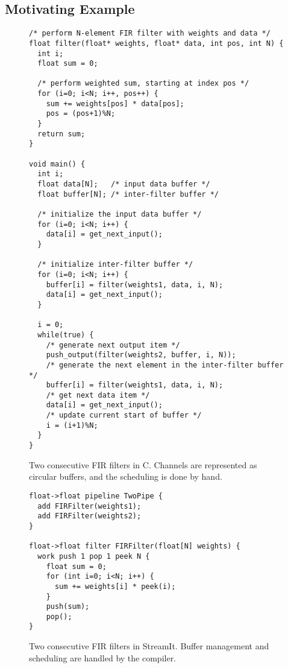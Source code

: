 \subsection{Motivating Example}
\begin{figure}
\center
\epsfxsize=2.0in
\scriptsize
\begin{verbatim}
/* perform N-element FIR filter with weights and data */
float filter(float* weights, float* data, int pos, int N) {
  int i;
  float sum = 0;

  /* perform weighted sum, starting at index pos */
  for (i=0; i<N; i++, pos++) {
    sum += weights[pos] * data[pos];
    pos = (pos+1)%N;
  }
  return sum;
}

void main() {
  int i;
  float data[N];   /* input data buffer */
  float buffer[N]; /* inter-filter buffer */
  
  /* initialize the input data buffer */
  for (i=0; i<N; i++) {
    data[i] = get_next_input();
  }
  
  /* initialize inter-filter buffer */
  for (i=0; i<N; i++) {
    buffer[i] = filter(weights1, data, i, N);
    data[i] = get_next_input();
  }
  
  i = 0;
  while(true) {
    /* generate next output item */
    push_output(filter(weights2, buffer, i, N));
    /* generate the next element in the inter-filter buffer */
    buffer[i] = filter(weights1, data, i, N);
    /* get next data item */
    data[i] = get_next_input();
    /* update current start of buffer */
    i = (i+1)%N;
  }
}
\end{verbatim}
\caption{Two consecutive FIR filters in C.  Channels are represented
as circular buffers, and the scheduling is done by hand.}
\label{fig:motivating-example}
\end{figure}

\begin{figure}
\scriptsize
\begin{verbatim}
float->float pipeline TwoPipe {
  add FIRFilter(weights1);
  add FIRFilter(weights2);
}

float->float filter FIRFilter(float[N] weights) {
  work push 1 pop 1 peek N {
    float sum = 0;
    for (int i=0; i<N; i++) {
      sum += weights[i] * peek(i);
    }
    push(sum);
    pop();
}
\end{verbatim}
\caption{Two consecutive FIR filters in StreamIt.  Buffer management
and scheduling are handled by the compiler.}
\label{fig:example-streamit}
\end{figure}

